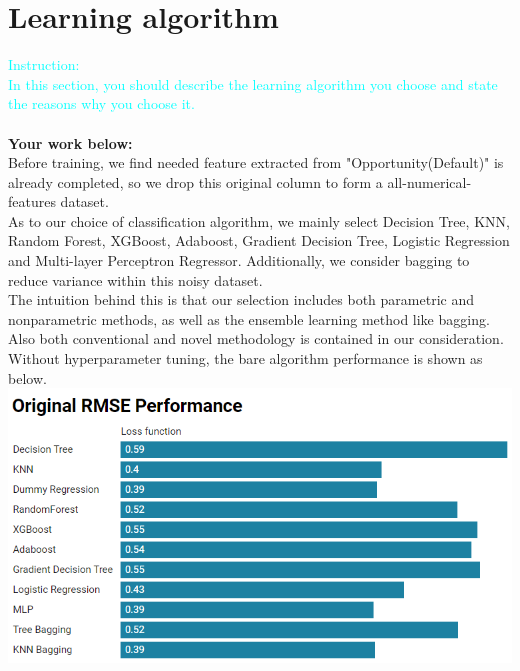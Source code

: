 \documentclass{article}
\begin{document}
\section{Learning algorithm}
\textcolor{cyan}{Instruction: \\
In this section, you should describe the learning algorithm you choose and state the reasons why you choose it.}\\\\
\textbf{Your work below:}\\
Before training, we find needed feature extracted from "Opportunity(Default)" is already completed, so we drop this original column to form a all-numerical-features dataset.\\
As to our choice of classification algorithm, we mainly select Decision Tree, KNN, Random Forest, XGBoost, Adaboost, Gradient Decision Tree,
Logistic Regression and Multi-layer Perceptron Regressor. Additionally, we consider bagging to reduce variance within this noisy dataset.\\
The intuition behind this is that our selection includes both parametric and nonparametric methods, as well as the ensemble learning method like bagging.
Also both conventional and novel methodology is contained in our consideration. \\
Without hyperparameter tuning, the bare algorithm performance is shown as below.\\
\includegraphics[width=1\linewidth]{original.png}
\end{document}
